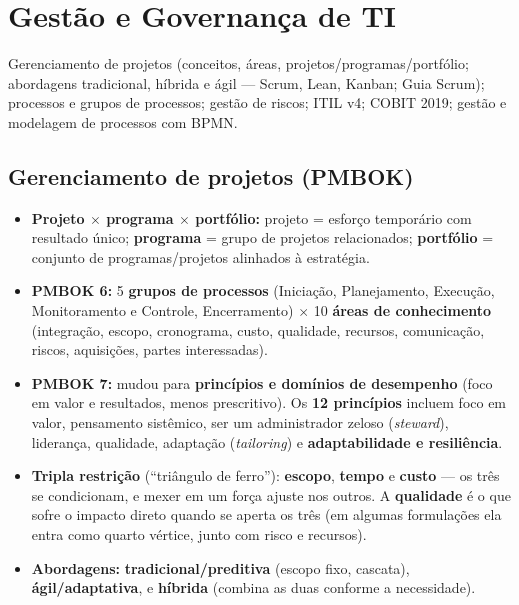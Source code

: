 \chapter{Gestão e Governança de TI}
\label{cap:governanca}

\begin{edital}
Gerenciamento de projetos (conceitos, áreas, projetos/programas/portfólio;
abordagens tradicional, híbrida e ágil --- Scrum, Lean, Kanban; Guia Scrum);
processos e grupos de processos; gestão de riscos; ITIL v4; COBIT 2019;
gestão e modelagem de processos com BPMN.
\end{edital}

\section{Gerenciamento de projetos (PMBOK)}

\begin{itemize}
\item \textbf{Projeto $\times$ programa $\times$ portfólio:} projeto =
esforço temporário com resultado único; \textbf{programa} = grupo de
projetos relacionados; \textbf{portfólio} = conjunto de programas/projetos
alinhados à estratégia.
\item \textbf{PMBOK 6:} 5 \textbf{grupos de processos} (Iniciação,
Planejamento, Execução, Monitoramento e Controle, Encerramento) $\times$ 10
\textbf{áreas de conhecimento} (integração, escopo, cronograma, custo,
qualidade, recursos, comunicação, riscos, aquisições, partes interessadas).
\item \textbf{PMBOK 7:} mudou para \textbf{princípios e domínios de
desempenho} (foco em valor e resultados, menos prescritivo). Os \textbf{12
princípios} incluem foco em valor, pensamento sistêmico, ser um
administrador zeloso (\textit{steward}), liderança, qualidade, adaptação
(\textit{tailoring}) e \textbf{adaptabilidade e resiliência}.
\item \textbf{Tripla restrição} (``triângulo de ferro''): \textbf{escopo},
\textbf{tempo} e \textbf{custo} --- os três se condicionam, e mexer em um
força ajuste nos outros. A \textbf{qualidade} é o que sofre o impacto direto
quando se aperta os três (em algumas formulações ela entra como quarto
vértice, junto com risco e recursos).
\item \textbf{Abordagens:} \textbf{tradicional/preditiva} (escopo fixo,
cascata), \textbf{ágil/adaptativa}, e \textbf{híbrida} (combina as duas
conforme a necessidade).
\end{itemize}

